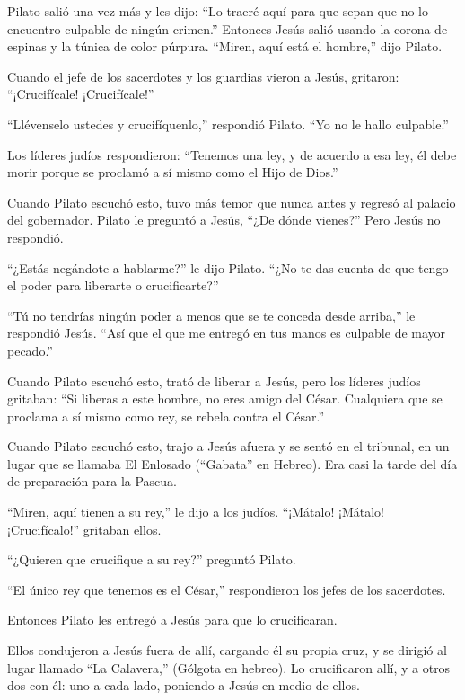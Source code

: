 Pilato salió una vez más y les dijo: ``Lo traeré aquí para
que sepan que no lo encuentro culpable de ningún crimen.'' 
Entonces Jesús salió usando la corona de espinas y la túnica de color
púrpura. ``Miren, aquí está el hombre,'' dijo Pilato.

 Cuando el jefe de los sacerdotes y los guardias vieron a
Jesús, gritaron: ``¡Crucifícale! ¡Crucifícale!''

``Llévenselo ustedes y crucifíquenlo,'' respondió Pilato. ``Yo no le
hallo culpable.''

 Los líderes judíos respondieron: ``Tenemos una ley, y de
acuerdo a esa ley, él debe morir porque se proclamó a sí mismo como el
Hijo de Dios.''

 Cuando Pilato escuchó esto, tuvo más temor que nunca antes
 y regresó al palacio del gobernador. Pilato le preguntó a
Jesús, ``¿De dónde vienes?'' Pero Jesús no respondió.

 ``¿Estás negándote a hablarme?'' le dijo Pilato. ``¿No te
das cuenta de que tengo el poder para liberarte o crucificarte?''

 ``Tú no tendrías ningún poder a menos que se te conceda
desde arriba,'' le respondió Jesús. ``Así que el que me entregó en tus
manos es culpable de mayor pecado.''

 Cuando Pilato escuchó esto, trató de liberar a Jesús, pero
los líderes judíos gritaban: ``Si liberas a este hombre, no eres amigo
del César. Cualquiera que se proclama a sí mismo como rey, se rebela
contra el César.''

 Cuando Pilato escuchó esto, trajo a Jesús afuera y se
sentó en el tribunal, en un lugar que se llamaba El Enlosado (``Gabata''
en Hebreo).  Era casi la tarde del día de preparación para
la Pascua.

``Miren, aquí tienen a su rey,'' le dijo a los judíos. 
``¡Mátalo! ¡Mátalo! ¡Crucifícalo!'' gritaban ellos.

``¿Quieren que crucifique a su rey?'' preguntó Pilato.

``El único rey que tenemos es el César,'' respondieron los jefes de los
sacerdotes.

 Entonces Pilato les entregó a Jesús para que lo
crucificaran.

 Ellos condujeron a Jesús fuera de allí, cargando él su
propia cruz, y se dirigió al lugar llamado ``La Calavera,'' (Gólgota en
hebreo).  Lo crucificaron allí, y a otros dos con él: uno a
cada lado, poniendo a Jesús en medio de ellos.

